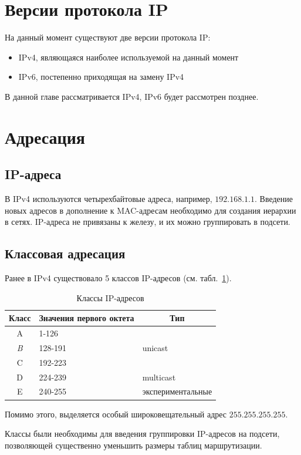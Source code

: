 \section{Версии протокола IP}
На данный момент существуют две версии протокола IP: 
\begin{itemize}
	\item IPv4, являющаяся наиболее используемой на данный момент
	\item IPv6, постепенно приходящая на замену IPv4
\end{itemize}

В данной главе рассматривается IPv4, IPv6 будет рассмотрен позднее.
\section{Адресация}
\subsection{IP-адреса}
В IPv4 используются четырехбайтовые адреса, например, $192.168.1.1$. Введение новых адресов в дополнение к MAC-адресам необходимо для создания иерархии в сетях. IP-адреса не привязаны к железу, и их можно группировать в подсети.
\subsection{Классовая адресация}
Ранее в IPv4 существовало 5 классов IP-адресов (см. табл.~\ref{tbl:ip_classes}). 
\begin{table}[h!]
	\centering
	\begin{tabular}{|c|l|l|}
		\hline
		Класс & \multicolumn{1}{c|}{Значения первого октета} & \multicolumn{1}{c|}{Тип} \\ \hline
		A & 1-126 & \multirow{3}{*}{unicast} \\ \cline{1-2}
		\textit{B} & 128-191 &  \\ \cline{1-2}
		C & 192-223 &  \\ \hline
		D & 224-239 & multicast \\ \hline
		E & 240-255 & экспериментальные \\ \hline
	\end{tabular}
	\caption{Классы IP-адресов}
	\label{tbl:ip_classes}
\end{table}

Помимо этого, выделяется особый широковещательный адрес $255.255.255.255$.

Классы были необходимы для введения группировки IP-адресов на подсети, позволяющей существенно уменьшить размеры таблиц маршрутизации.

